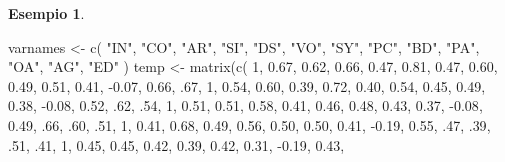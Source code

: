 \documentclass[
  11pt,
]{krantz}
\makeatletter
\newenvironment{Shaded}{\begin{snugshade}}{\end{snugshade}}
\newcommand{\DecValTok}[1]{\textcolor[rgb]{0.06,0.06,0.06}{#1}}
\newcommand{\FloatTok}[1]{\textcolor[rgb]{0.06,0.06,0.06}{#1}}
\newcommand{\FunctionTok}[1]{\textcolor[rgb]{0,0,0}{#1}}
\newcommand{\NormalTok}[1]{#1}
\newcommand{\OtherTok}[1]{\textcolor[rgb]{0.37,0.37,0.37}{#1}}
\newcommand{\SpecialCharTok}[1]{\textcolor[rgb]{0,0,0}{#1}}
\newcommand{\StringTok}[1]{\textcolor[rgb]{0.5,0.5,0.5}{#1}}
\newenvironment{kframe}{%
\medskip{}
\setlength{\fboxsep}{.8em}
 \def\at@end@of@kframe{}%
 \ifinner\ifhmode%
  \def\at@end@of@kframe{\end{minipage}}%
  \begin{minipage}{\columnwidth}%
 \fi\fi%
 \def\FrameCommand##1{\hskip\@totalleftmargin \hskip-\fboxsep
 \colorbox{shadecolor}{##1}\hskip-\fboxsep
     \hskip-\linewidth \hskip-\@totalleftmargin \hskip\columnwidth}%
 \MakeFramed {\advance\hsize-\width
   \@totalleftmargin\z@ \linewidth\hsize
   \@setminipage}}%
 {\par\unskip\endMakeFramed%
 \at@end@of@kframe}
\renewenvironment{Shaded}{\begin{kframe}}{\end{kframe}}
\theoremstyle{definition}
\theoremstyle{definition}
\newtheorem{example}{Esempio}[chapter]
\theoremstyle{definition}
\theoremstyle{definition}
\theoremstyle{remark}
\makeatother
\begin{document}
\begin{example}
\begin{Shaded}
\begin{Highlighting}[]
\NormalTok{varnames }\OtherTok{\textless{}{-}} \FunctionTok{c}\NormalTok{(}
  \StringTok{"IN"}\NormalTok{, }\StringTok{"CO"}\NormalTok{, }\StringTok{"AR"}\NormalTok{, }\StringTok{"SI"}\NormalTok{, }\StringTok{"DS"}\NormalTok{, }\StringTok{"VO"}\NormalTok{, }\StringTok{"SY"}\NormalTok{, }\StringTok{"PC"}\NormalTok{,}
  \StringTok{"BD"}\NormalTok{, }\StringTok{"PA"}\NormalTok{, }\StringTok{"OA"}\NormalTok{, }\StringTok{"AG"}\NormalTok{, }\StringTok{"ED"}
\NormalTok{)}
\NormalTok{temp }\OtherTok{\textless{}{-}} \FunctionTok{matrix}\NormalTok{(}\FunctionTok{c}\NormalTok{(}
  \DecValTok{1}\NormalTok{, }\FloatTok{0.67}\NormalTok{, }\FloatTok{0.62}\NormalTok{, }\FloatTok{0.66}\NormalTok{, }\FloatTok{0.47}\NormalTok{, }\FloatTok{0.81}\NormalTok{, }\FloatTok{0.47}\NormalTok{, }\FloatTok{0.60}\NormalTok{, }\FloatTok{0.49}\NormalTok{, }\FloatTok{0.51}\NormalTok{, }\FloatTok{0.41}\NormalTok{,}
  \SpecialCharTok{{-}}\FloatTok{0.07}\NormalTok{, }\FloatTok{0.66}\NormalTok{, .}\DecValTok{67}\NormalTok{, }\DecValTok{1}\NormalTok{, }\FloatTok{0.54}\NormalTok{, }\FloatTok{0.60}\NormalTok{, }\FloatTok{0.39}\NormalTok{, }\FloatTok{0.72}\NormalTok{, }\FloatTok{0.40}\NormalTok{, }\FloatTok{0.54}\NormalTok{, }\FloatTok{0.45}\NormalTok{,}
  \FloatTok{0.49}\NormalTok{, }\FloatTok{0.38}\NormalTok{, }\SpecialCharTok{{-}}\FloatTok{0.08}\NormalTok{, }\FloatTok{0.52}\NormalTok{, .}\DecValTok{62}\NormalTok{, .}\DecValTok{54}\NormalTok{, }\DecValTok{1}\NormalTok{, }\FloatTok{0.51}\NormalTok{, }\FloatTok{0.51}\NormalTok{, }\FloatTok{0.58}\NormalTok{, }\FloatTok{0.41}\NormalTok{,}
  \FloatTok{0.46}\NormalTok{, }\FloatTok{0.48}\NormalTok{, }\FloatTok{0.43}\NormalTok{, }\FloatTok{0.37}\NormalTok{, }\SpecialCharTok{{-}}\FloatTok{0.08}\NormalTok{, }\FloatTok{0.49}\NormalTok{, .}\DecValTok{66}\NormalTok{, .}\DecValTok{60}\NormalTok{, .}\DecValTok{51}\NormalTok{, }\DecValTok{1}\NormalTok{, }\FloatTok{0.41}\NormalTok{,}
  \FloatTok{0.68}\NormalTok{, }\FloatTok{0.49}\NormalTok{, }\FloatTok{0.56}\NormalTok{, }\FloatTok{0.50}\NormalTok{, }\FloatTok{0.50}\NormalTok{, }\FloatTok{0.41}\NormalTok{, }\SpecialCharTok{{-}}\FloatTok{0.19}\NormalTok{, }\FloatTok{0.55}\NormalTok{, .}\DecValTok{47}\NormalTok{, .}\DecValTok{39}\NormalTok{, .}\DecValTok{51}\NormalTok{,}
\NormalTok{  .}\DecValTok{41}\NormalTok{, }\DecValTok{1}\NormalTok{, }\FloatTok{0.45}\NormalTok{, }\FloatTok{0.45}\NormalTok{, }\FloatTok{0.42}\NormalTok{, }\FloatTok{0.39}\NormalTok{, }\FloatTok{0.42}\NormalTok{, }\FloatTok{0.31}\NormalTok{, }\SpecialCharTok{{-}}\FloatTok{0.19}\NormalTok{, }\FloatTok{0.43}\NormalTok{,}

\end{Highlighting}
\end{Shaded}
\end{example}
\end{document}
